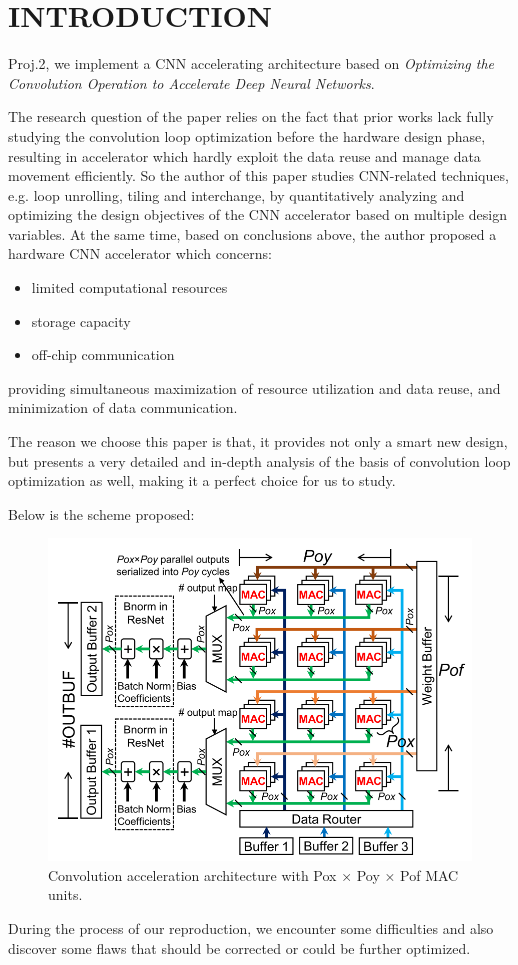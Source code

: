\section{INTRODUCTION}

 Proj.2, we implement a CNN accelerating architecture based on \textit{Optimizing the Convolution Operation to Accelerate Deep Neural Networks}\cite{maOptimizingConvolutionOperation2018}.

The research question of the paper relies on the fact that prior works lack fully studying the convolution loop optimization before the hardware design phase, resulting in accelerator which hardly exploit the data reuse and manage data movement efficiently. So the author of this paper studies CNN-related techniques, e.g. loop unrolling, tiling and interchange, by quantitatively analyzing and optimizing the design objectives of the CNN accelerator based on multiple design variables. At the same time, based on conclusions above, the author proposed a hardware CNN accelerator which concerns:

\begin{itemize}
    \item limited computational resources
    \item storage capacity
    \item off-chip communication
\end{itemize}

providing simultaneous maximization of resource utilization and data reuse, and minimization of data communication.

The reason we choose this paper is that, it provides not only a smart new design, but presents a very detailed and in-depth analysis of the basis of convolution loop optimization as well, making it a perfect choice for us to study.

Below is the scheme proposed:

\begin{figure}[!htb]
    \centering
    \includegraphics[width=0.9\columnwidth]{../figures/Arch.png}
    \caption{Convolution acceleration architecture with Pox × Poy × Pof MAC units.}
    \label{fig:Arch}
\end{figure}

During the process of our reproduction, we encounter some difficulties and also discover some flaws that should be corrected or could be further optimized.